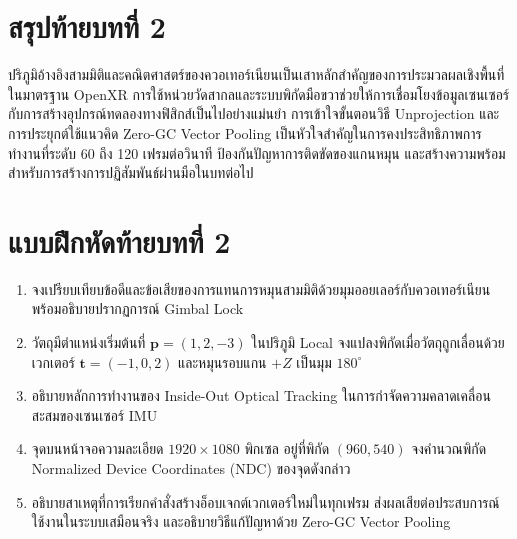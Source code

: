 \clearpage

\section*{สรุปท้ายบทที่ 2}

ปริภูมิอ้างอิงสามมิติและคณิตศาสตร์ของควอเทอร์เนียนเป็นเสาหลักสำคัญของการประมวลผลเชิงพื้นที่ในมาตรฐาน OpenXR การใช้หน่วยวัดสากลและระบบพิกัดมือขวาช่วยให้การเชื่อมโยงข้อมูลเซนเซอร์กับการสร้างอุปกรณ์ทดลองทางฟิสิกส์เป็นไปอย่างแม่นยำ การเข้าใจขั้นตอนวิธี Unprojection และการประยุกต์ใช้แนวคิด Zero-GC Vector Pooling เป็นหัวใจสำคัญในการคงประสิทธิภาพการทำงานที่ระดับ 60 ถึง 120 เฟรมต่อวินาที ป้องกันปัญหาการติดขัดของแกนหมุน และสร้างความพร้อมสำหรับการสร้างการปฏิสัมพันธ์ผ่านมือในบทต่อไป

\clearpage

\section*{แบบฝึกหัดท้ายบทที่ 2}

\begin{enumerate}
    \item จงเปรียบเทียบข้อดีและข้อเสียของการแทนการหมุนสามมิติด้วยมุมออยเลอร์กับควอเทอร์เนียน พร้อมอธิบายปรากฏการณ์ Gimbal Lock
    \item วัตถุมีตำแหน่งเริ่มต้นที่ $\mathbf{p} = (1, 2, -3)$ ในปริภูมิ Local จงแปลงพิกัดเมื่อวัตถุถูกเลื่อนด้วยเวกเตอร์ $\mathbf{t} = (-1, 0, 2)$ และหมุนรอบแกน $+Z$ เป็นมุม $180^\circ$
    \item อธิบายหลักการทำงานของ Inside-Out Optical Tracking ในการกำจัดความคลาดเคลื่อนสะสมของเซนเซอร์ IMU
    \item จุดบนหน้าจอความละเอียด $1920 \times 1080$ พิกเซล อยู่ที่พิกัด $(960, 540)$ จงคำนวณพิกัด Normalized Device Coordinates (NDC) ของจุดดังกล่าว
    \item อธิบายสาเหตุที่การเรียกคำสั่งสร้างอ็อบเจกต์เวกเตอร์ใหม่ในทุกเฟรม ส่งผลเสียต่อประสบการณ์ใช้งานในระบบเสมือนจริง และอธิบายวิธีแก้ปัญหาด้วย Zero-GC Vector Pooling
\end{enumerate}
